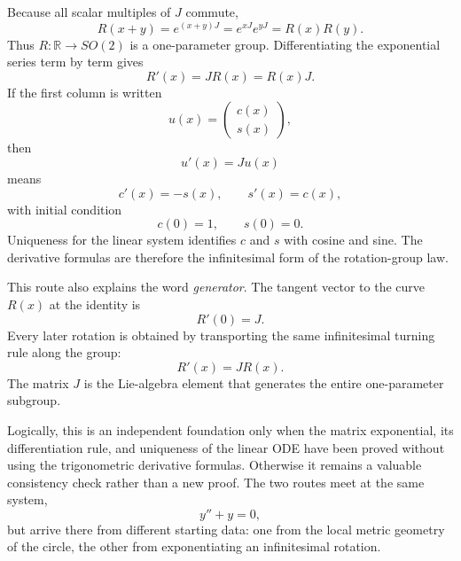 Because all scalar multiples of \(J\) commute,
\[
  R(x+y)=e^{(x+y)J}=e^{xJ}e^{yJ}=R(x)R(y).
\]
Thus \(R:\mathbb R\to SO(2)\) is a one-parameter group.  Differentiating the exponential series term by term gives
\[
  R'(x)=JR(x)=R(x)J.
\]
If the first column is written
\[
  u(x)=
  \begin{pmatrix}c(x)\\s(x)\end{pmatrix},
\]
then
\[
  u'(x)=Ju(x)
\]
means
\[
  c'(x)=-s(x),
  \qquad
  s'(x)=c(x),
\]
with initial condition
\[
  c(0)=1,
  \qquad
  s(0)=0.
\]
Uniqueness for the linear system identifies \(c\) and \(s\) with cosine and sine.  The derivative formulas are therefore the infinitesimal form of the rotation-group law.

This route also explains the word \emph{generator}.  The tangent vector to the curve \(R(x)\) at the identity is
\[
  R'(0)=J.
\]
Every later rotation is obtained by transporting the same infinitesimal turning rule along the group:
\[
  R'(x)=JR(x).
\]
The matrix \(J\) is the Lie-algebra element that generates the entire one-parameter subgroup.

Logically, this is an independent foundation only when the matrix exponential, its differentiation rule, and uniqueness of the linear ODE have been proved without using the trigonometric derivative formulas.  Otherwise it remains a valuable consistency check rather than a new proof.  The two routes meet at the same system,
\[
  y''+y=0,
\]
but arrive there from different starting data: one from the local metric geometry of the circle, the other from exponentiating an infinitesimal rotation.
